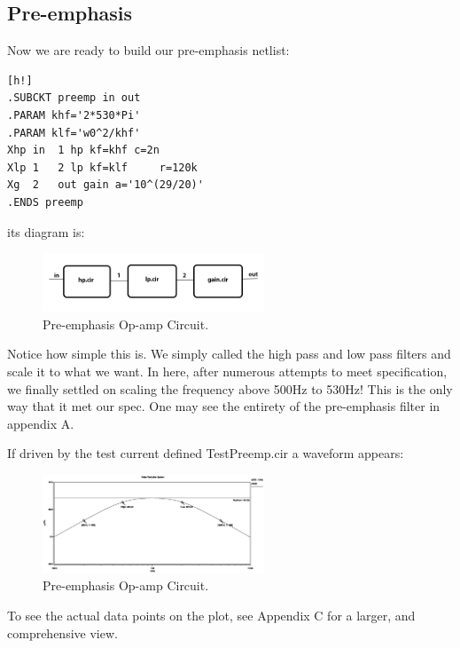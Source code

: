 \documentclass[a4paper]{IEEEtran}
\begin{document}
	\subsection{Pre-emphasis}
		Now we are ready to build our pre-emphasis netlist:
		\begin{center}
		\begin{lstlisting}[caption=Pre-emphasis netlist.][h!]
.SUBCKT preemp in out
.PARAM khf='2*530*Pi'
.PARAM klf='w0^2/khf'
Xhp	in	1 hp kf=khf	c=2n
Xlp	1	2 lp kf=klf 	r=120k
Xg	2	out gain a='10^(29/20)'
.ENDS preemp
		\end{lstlisting}
		\end{center}
		its diagram is:
		\begin{figure}[h!]
			\label{preemp.cir}
			\includegraphics[width=250px]{preemp-sim.jpg}
			\caption{Pre-emphasis Op-amp Circuit.}
		\end{figure}
		Notice how simple this is. We simply called the high pass and low pass filters and scale it to what we want. In here, after numerous attempts to meet specification, we finally settled on scaling the frequency above 500Hz to 530Hz! This is the only way that it met our spec. One may see the entirety of the pre-emphasis filter in appendix A.
		
		\newpage
		If driven by the test current defined TestPreemp.cir a waveform appears:
		
		\begin{figure}[h!]
			\label{preemp-plot.cir}
			\includegraphics[width=250px]{preemp_plot.eps}
			\caption{Pre-emphasis Op-amp Circuit.}
		\end{figure}
		
		To see the actual data points on the plot, see Appendix C for a larger, and comprehensive view.
\end{document}
